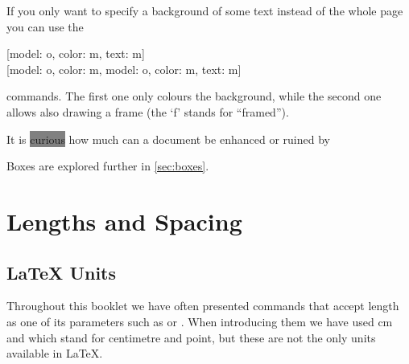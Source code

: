 If you only want to specify a background of some text instead of the whole page
you can use the
\begin{lscommand}
  [model: o, color: m, text: m] \\
  [model: o, color: m, model: o, color: m, text: m]
\end{lscommand}
commands. The first one only colours the background, while the second one
allows also drawing a frame (the \enquote*{f} stands for \enquote{framed}).
\begin{example}
It is \colorbox{gray}{curious}
how much can a document be
enhanced or ruined by
\end{example}
Boxes are explored further in \autoref{sec:boxes}.

\section{Lengths and Spacing}

\subsection{\LaTeX{} Units}%
\label{sec:dimensions}
\begingroup
{}
\ExplSyntaxOn
{}

\ExplSyntaxOff

Throughout this booklet we have often presented commands that accept length as
one of its parameters such as \csi{\bs} or . When introducing
them we have used \unit{\cm} and \unit{\pt} which stand for centimetre and
point, but these are not the only units available in \LaTeX{}.


